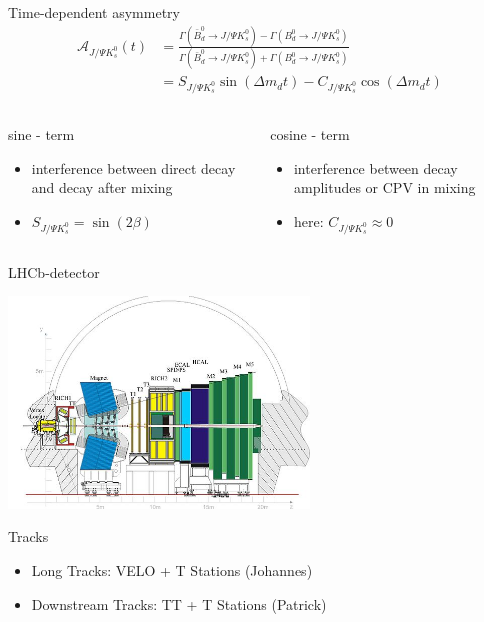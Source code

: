 \documentclass{beamer}
\begin{document}
	\begin{frame}{Time-dependent asymmetry}
	\begin{align}
	\mathcal{A}_{J/\Psi K_s^0}(t) &= \frac{\Gamma(\bar{B}_d^0 \rightarrow J/\Psi K_s^0)-\Gamma(B_d^0 \rightarrow J/\Psi K_s^0)}{\Gamma(\bar{B}_d^0 \rightarrow J/\Psi K_s^0)+\Gamma(B_d^0 \rightarrow J/\Psi K_s^0)} \\
		&= S_{J/\Psi K_s^0}\sin(\Delta m_d t) - C_{J/\Psi K_s^0}\cos(\Delta m_d t)
	\end{align}
	\begin{columns}
	\begin{block}{sine - term}
	\begin{itemize}
		\item interference between direct decay and decay after mixing
		\item $S_{J/\Psi K_s^0} = \sin(2\beta)$
	\end{itemize}
	\end{block}
	
	\begin{block}{cosine - term}
	\begin{itemize}
		\item interference between decay amplitudes or CPV in mixing
		\item here: $C_{J/\Psi K_s^0} \approx 0$
	\end{itemize}
	\end{block}
	\end{columns}
	\end{frame}
	
	\begin{frame}{LHCb-detector}
	\begin{center}
	\includegraphics[width = 0.6\textwidth]{detector}
	\end{center}
	\begin{block}{Tracks}
	\begin{itemize}
		\item Long Tracks: VELO + T Stations (Johannes)
		\item Downstream Tracks: TT + T Stations (Patrick)
	\end{itemize}
	\end{block}	
	\end{frame}
	
\end{document}
